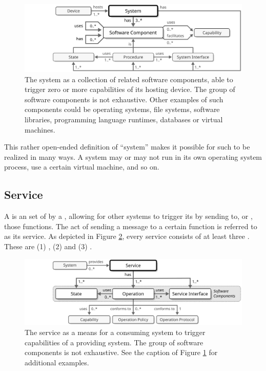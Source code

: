 \begin{figure}[ht!]
  \centering
  \includegraphics[scale=0.9]{figures/system}
  \caption{
    The system as a collection of related software components, able to trigger zero or more capabilities of its hosting device.
    The group of software components is not exhaustive.
    Other examples of such components could be operating systems, file systems, software libraries, programming language runtimes, databases or virtual machines.
  }
  \label{fig:system}
\end{figure}

This rather open-ended definition of ``system'' makes it possible for such to be realized in many ways.
A system may or may not run in its own operating system process, use a certain virtual machine, and so on.

\subsection{Service}
\label{sec:concepts:service}

A  is an  set of   by a , allowing for other systems to trigger its  by sending  to, or , those functions.
The act of sending a message to a certain function is referred to as  its service.
As depicted in Figure \ref{fig:service}, every service consists of at least three .
These are (1) , (2)  and (3) .

\begin{figure}[ht!]
  \centering
  \includegraphics[scale=0.9]{figures/service}
  \caption{
    The service as a means for a consuming system to trigger capabilities of a providing system.
    The group of software components is not exhaustive.
    See the caption of Figure \ref{fig:system} for additional examples.
  }
  \label{fig:service}
\end{figure}

